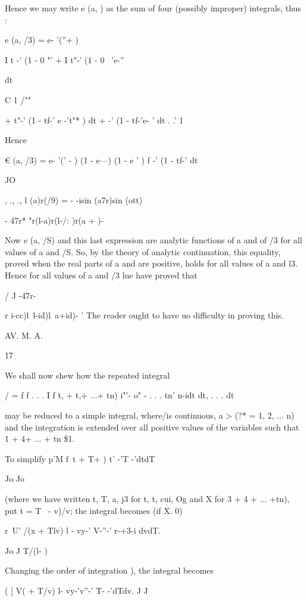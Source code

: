 Hence we may write e (a, ) as the sum of four (possibly improper)
integrals, thus :

e (a, /3) = e- '(''+ )

I t -' (1 - 0 "' + I t"-' (1 - 0 ~'e-''

 dt

C 1 /""

+ t"-' (1 - tf-' e -'t"* ) dt + -' (1 - tf-'e- ' dt . .' 1

Hence

€ (a, /3) = e- '(' - ) (1 - e---) (1 - e ' ) f -' (1 - tf-' dt

JO

, ., ., l (a)r(/9) = - -isin (a7r)sin (ott) ~

- 47r* "r(l-a)r(l-/: )r(a + )-

Now e (a, /S) and this last expression are analytic functions of a and
of /3 for all values of a and /S. So, by the theory of analytic
continuation, this equality, proved when the real parts of a and are
positive, holds for all values of a and l3. Hence for all values of a
and /3 lue have proved that

/ J -47r-

r i-cc)l\ l-id)l\ a+id)- ' The reader ought to have uo difficulty in
proving this.

AV. M. A.

17

%
%


We shall now shew how the repeated integral

/ = f f . . . I f t, + t,+ ...+ tn) i"'- o" - . . . tn' n-idt dt, . .
. dt

may be reduced to a simple integral, where/is continuous, a > (?* = 1,
2, ... n) and the integration is extended over all positive values of
the variables such that 1 + 4+ ... + tn \$1.

To simplify p'M f\ t + T+ ) t' -'T -'dtdT

Jo Jo

(where we have written t, T, a, j3 for t, t, cui, Og and X for 3 + 4
+ ... +tn), put t = T \ - v)/v; the integral becomes (if X. 0)

r~U' /(x + Tlv) l - vy-' V-''-' r-+3-i dvdT.

Jo J T/(l- )

Changing the order of integration ), the integral becomes

( [ V( + T/v) l- vy-'v''-' T- -'dTdv. J J

